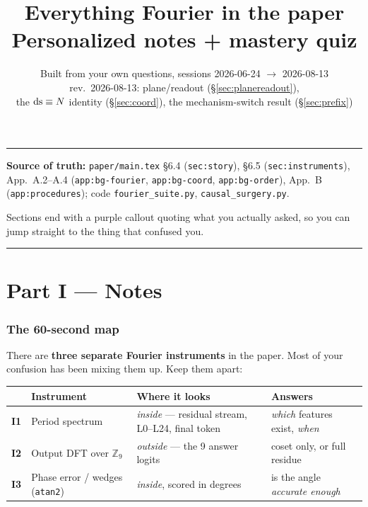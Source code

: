 \documentclass[11pt]{article}
\title{\textbf{Everything Fourier in the paper}\\[4pt]
\large Personalized notes {\normalsize+} mastery quiz}
\author{Built from your own questions, sessions 2026-06-24 $\to$ 2026-08-13\\
\normalsize rev.\ 2026-08-13: plane/readout (\S\ref{sec:planereadout}),\\
\normalsize the $\mathrm{ds} \equiv N$ identity (\S\ref{sec:coord}), the mechanism-switch result (\S\ref{sec:prefix})}
\date{}
\begin{document}
\maketitle
\vspace{-2em}

\noindent\rule{\textwidth}{0.4pt}

\noindent\textbf{Source of truth:} \texttt{paper/main.tex} \S6.4 (\texttt{sec:story}),
\S6.5 (\texttt{sec:instruments}), App.~A.2--A.4 (\texttt{app:bg-fourier},
\texttt{app:bg-coord}, \texttt{app:bg-order}), App.~B (\texttt{app:procedures});
code \texttt{fourier\_suite.py}, \texttt{causal\_surgery.py}.

\noindent Sections end with a \textcolor{qcol}{purple callout} quoting what you
actually asked, so you can jump straight to the thing that confused you.

\noindent\rule{\textwidth}{0.4pt}

\tableofcontents
\newpage

\part*{Part I --- Notes}

\section{The 60-second map}

There are \textbf{three separate Fourier instruments} in the paper. Most of your
confusion has been mixing them up. Keep them apart:

\begin{center}
\small
\begin{tabular}{@{}llp{5.4cm}l@{}}
\toprule
& \textbf{Instrument} & \textbf{Where it looks} & \textbf{Answers} \\
\midrule
\textbf{I1} & Period spectrum & \emph{inside} --- residual stream, L0--L24, final token
  & \emph{which} features exist, \emph{when} \\
\textbf{I2} & Output DFT over $\mathbb{Z}_9$ & \emph{outside} --- the 9 answer logits
  & coset only, or full residue \\
\textbf{I3} & Phase error / wedges (\texttt{atan2}) & \emph{inside}, scored in degrees
  & is the angle \emph{accurate enough} \\
\bottomrule
\end{tabular}
\end{center}
\end{document}
